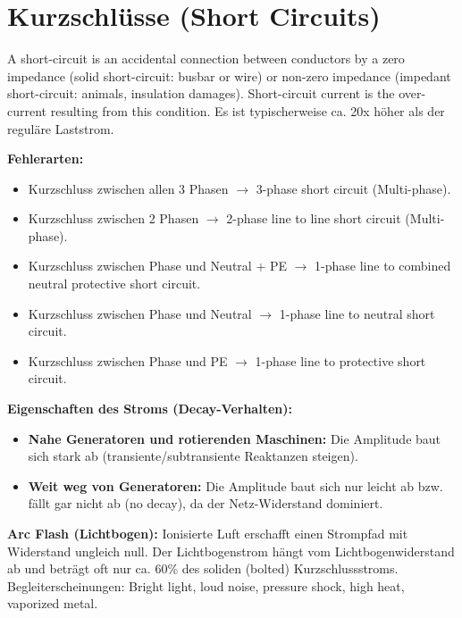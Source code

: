 \documentclass[11pt, a4paper]{article}
\begin{document}
\section{Kurzschlüsse (Short Circuits)}
A short-circuit is an accidental connection between conductors by a zero impedance (solid short-circuit: busbar or wire) or non-zero impedance (impedant short-circuit: animals, insulation damages).
Short-circuit current is the over-current resulting from this condition. Es ist typischerweise ca. 20x höher als der reguläre Laststrom.

\textbf{Fehlerarten:}
\begin{itemize}
    \item Kurzschluss zwischen allen 3 Phasen $\rightarrow$ 3-phase short circuit (Multi-phase).
    \item Kurzschluss zwischen 2 Phasen $\rightarrow$ 2-phase line to line short circuit (Multi-phase).
    \item Kurzschluss zwischen Phase und Neutral + PE $\rightarrow$ 1-phase line to combined neutral protective short circuit.
    \item Kurzschluss zwischen Phase und Neutral $\rightarrow$ 1-phase line to neutral short circuit.
    \item Kurzschluss zwischen Phase und PE $\rightarrow$ 1-phase line to protective short circuit.
\end{itemize}

\textbf{Eigenschaften des Stroms (Decay-Verhalten):}
\begin{itemize}
    \item \textbf{Nahe Generatoren und rotierenden Maschinen:} Die Amplitude baut sich stark ab (transiente/subtransiente Reaktanzen steigen).
    \item \textbf{Weit weg von Generatoren:} Die Amplitude baut sich nur leicht ab bzw. fällt gar nicht ab (no decay), da der Netz-Widerstand dominiert.
\end{itemize}

\textbf{Arc Flash (Lichtbogen):}
Ionisierte Luft erschafft einen Strompfad mit Widerstand ungleich null. Der Lichtbogenstrom hängt vom Lichtbogenwiderstand ab und beträgt oft nur ca. 60\% des soliden (bolted) Kurzschlussstroms. Begleiterscheinungen: Bright light, loud noise, pressure shock, high heat, vaporized metal.
\end{document}
